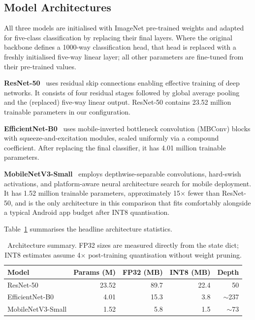 \documentclass[conference,10pt]{IEEEtran}
\begin{document}
\subsection{Model Architectures}

All three models are initialised with ImageNet pre-trained weights and
adapted for five-class classification by replacing their final layers. Where
the original backbone defines a 1000-way classification head, that head is
replaced with a freshly initialised five-way linear layer; all other
parameters are fine-tuned from their pre-trained values.

\textbf{ResNet-50}~\cite{he2016} uses residual skip connections enabling
effective training of deep networks. It consists of four residual stages
followed by global average pooling and the (replaced) five-way linear output.
ResNet-50 contains 23.52 million trainable parameters in our configuration.

\textbf{EfficientNet-B0}~\cite{tan2019} uses mobile-inverted bottleneck
convolution (MBConv) blocks with squeeze-and-excitation modules, scaled
uniformly via a compound coefficient. After replacing the final classifier, it
has 4.01 million trainable parameters.

\textbf{MobileNetV3-Small}~\cite{howard2019} employs depthwise-separable
convolutions, hard-swish activations, and platform-aware neural architecture
search for mobile deployment. It has 1.52 million trainable parameters,
approximately 15$\times$ fewer than ResNet-50, and is the only architecture
in this comparison that fits comfortably alongside a typical Android app
budget after INT8 quantisation.

Table~\ref{tab:arch} summarises the headline architecture statistics.

\begin{table}[t]
\centering
\caption{Architecture summary. FP32 sizes are measured directly from the
state dict; INT8 estimates assume 4$\times$ post-training quantisation
without weight pruning.}
\label{tab:arch}
\renewcommand{\arraystretch}{1.15}
\begin{tabular}{lrrrr}
\toprule
\textbf{Model} & \textbf{Params (M)} & \textbf{FP32 (MB)} & \textbf{INT8 (MB)} & \textbf{Depth} \\
\midrule
ResNet-50          & 23.52 & 89.7 & 22.4 & 50 \\
EfficientNet-B0    &  4.01 & 15.3 &  3.8 & $\sim$237 \\
MobileNetV3-Small  &  1.52 &  5.8 &  1.5 & $\sim$73 \\
\bottomrule
\end{tabular}
\end{table}
\end{document}
